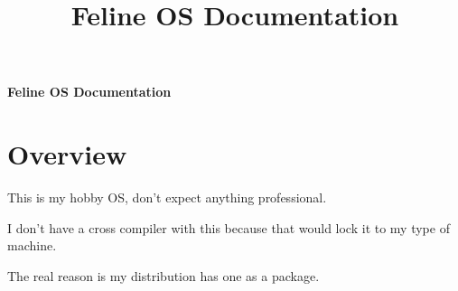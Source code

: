 \documentclass[12pt]{article}
\title{Feline OS Documentation}
\begin{document}
\begin{center}
\fontsize{25}{35}
\selectfont
\textbf{Feline OS Documentation}
\end{center}

\section{Overview}
\begin{list}{}{}
\item This is my hobby OS, don't expect anything professional.
\item I don't have a cross compiler with this because that would lock it to my type of machine.
\begin{tiny} The real reason is my distribution has one as a package.\end{tiny}

\end{list}
\end{document}
